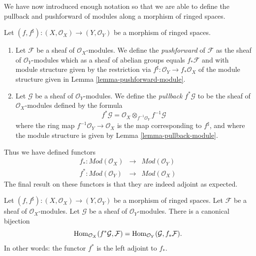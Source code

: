 \noindent
We have now introduced enough notation so that we are able to
define the pullback and pushforward of modules along a morphism
of ringed spaces.

\begin{definition}
\label{definition-pushforward}
Let $(f, f^\sharp) : (X, \mathcal{O}_X) \to (Y, \mathcal{O}_Y)$
be a morphism of ringed spaces.
\begin{enumerate}
\item Let $\mathcal{F}$ be a sheaf of $\mathcal{O}_X$-modules.
We define the {\it pushforward} of $\mathcal{F}$ as the
sheaf of $\mathcal{O}_Y$-modules which as a sheaf
of abelian groups equals $f_*\mathcal{F}$ and with
module structure given by the restriction
via $f^\sharp : \mathcal{O}_Y \to f_*\mathcal{O}_X$
of the module structure given
in Lemma \ref{lemma-pushforward-module}.
\item Let $\mathcal{G}$ be a sheaf of $\mathcal{O}_Y$-modules.
We define the {\it pullback} $f^*\mathcal{G}$ to be the
sheaf of $\mathcal{O}_X$-modules defined by the formula
$$
f^*\mathcal{G}
=
\mathcal{O}_X \otimes_{f^{-1}\mathcal{O}_Y} f^{-1}\mathcal{G}
$$
where the ring map $f^{-1}\mathcal{O}_Y \to \mathcal{O}_X$
is the map corresponding to $f^\sharp$, and where the  module
structure is given by Lemma \ref{lemma-pullback-module}.
\end{enumerate}
\end{definition}

\noindent
Thus we have defined functors
\begin{eqnarray*}
f_* : \textit{Mod}(\mathcal{O}_X)
& \longrightarrow &
\textit{Mod}(\mathcal{O}_Y) \\
f^* : \textit{Mod}(\mathcal{O}_Y)
& \longrightarrow &
\textit{Mod}(\mathcal{O}_X)
\end{eqnarray*}
The final result on these functors is that they are indeed
adjoint as expected.

\begin{lemma}
\label{lemma-adjoint-pullback-pushforward-modules}
Let $(f, f^\sharp) : (X, \mathcal{O}_X) \to (Y, \mathcal{O}_Y)$
be a morphism of ringed spaces.
Let $\mathcal{F}$ be a sheaf of $\mathcal{O}_X$-modules.
Let $\mathcal{G}$ be a sheaf of $\mathcal{O}_Y$-modules.
There is a canonical bijection
$$
\mathop{\mathrm{Hom}}\nolimits_{\mathcal{O}_X}(f^*\mathcal{G}, \mathcal{F})
=
\mathop{\mathrm{Hom}}\nolimits_{\mathcal{O}_Y}(\mathcal{G}, f_*\mathcal{F}).
$$
In other words: the functor $f^*$ is the left adjoint to
$f_*$.
\end{lemma}

